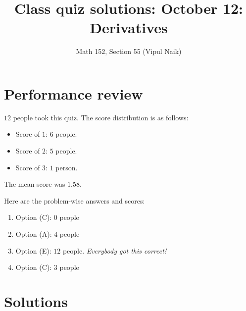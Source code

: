 \documentclass[10pt]{amsart}
\title{Class quiz solutions: October 12: Derivatives}
\author{Math 152, Section 55 (Vipul Naik)}
\begin{document}
\maketitle

\section{Performance review}

$12$ people took this quiz. The score distribution is as follows:

\begin{itemize}
\item Score of $1$: $6$ people.
\item Score of $2$: $5$ people.
\item Score of $3$: $1$ person.
\end{itemize}

The mean score was $1.58$.

Here are the problem-wise answers and scores:

\begin{enumerate}
\item Option (C): $0$ people
\item Option (A): $4$ people
\item Option (E): $12$ people. {\em Everybody got this correct!}
\item Option (C): $3$ people
\end{enumerate}

\section{Solutions}
\end{document}
